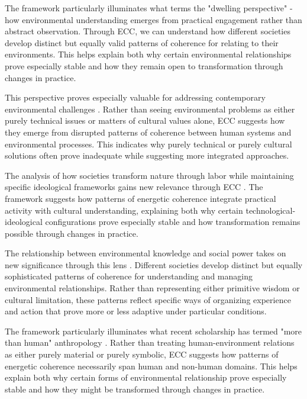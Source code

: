 The framework particularly illuminates what \cite{ingold2000perception} terms the "dwelling perspective" - how environmental understanding emerges from practical engagement rather than abstract observation. Through ECC, we can understand how different societies develop distinct but equally valid patterns of coherence for relating to their environments. This helps explain both why certain environmental relationships prove especially stable and how they remain open to transformation through changes in practice.

This perspective proves especially valuable for addressing contemporary environmental challenges \cite{tsing2015mushroom}. Rather than seeing environmental problems as either purely technical issues or matters of cultural values alone, ECC suggests how they emerge from disrupted patterns of coherence between human systems and environmental processes. This indicates why purely technical or purely cultural solutions often prove inadequate while suggesting more integrated approaches.

The analysis of how societies transform nature through labor while maintaining specific ideological frameworks gains new relevance through ECC \cite{bateson1972steps}. The framework suggests how patterns of energetic coherence integrate practical activity with cultural understanding, explaining both why certain technological-ideological configurations prove especially stable and how transformation remains possible through changes in practice.

The relationship between environmental knowledge and social power takes on new significance through this lens \cite{tsing2015mushroom}. Different societies develop distinct but equally sophisticated patterns of coherence for understanding and managing environmental relationships. Rather than representing either primitive wisdom or cultural limitation, these patterns reflect specific ways of organizing experience and action that prove more or less adaptive under particular conditions.

The framework particularly illuminates what recent scholarship has termed "more than human" anthropology \cite{kohn2013forests}. Rather than treating human-environment relations as either purely material or purely symbolic, ECC suggests how patterns of energetic coherence necessarily span human and non-human domains. This helps explain both why certain forms of environmental relationship prove especially stable and how they might be transformed through changes in practice.

